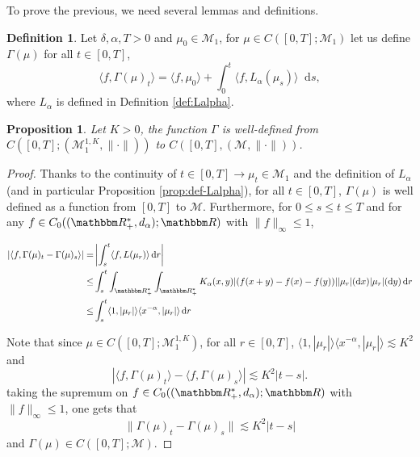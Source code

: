 \documentclass[a4paper,11pt, reqno]{amsart}
\newcommand{\cM}{\mathcal{M}}	\newcommand{\MM}{\mathbbm{M}}
\newcommand{\dd}{\mathop{}\!\mathrm{d}}
\newcommand{\1}{\mathbbm{1}}
\theoremstyle{plain}
\newtheorem{proposition}[theorem]{Proposition}
\theoremstyle{definition}
\newtheorem{definition}[theorem]{Definition}
\begin{document}
To prove the previous, we need several lemmas and definitions.

\begin{definition}
  Let $\delta, \alpha, T > 0$ and $\mu_0 \in \cM_1$, for $\mu \in C
  ([0, T] ; \cM_1)$ let us define $\Gamma (\mu)$ for all $t \in [0,
  T]$,
  \[ \langle f, \Gamma (\mu)_t \rangle = \langle f, \mu_0 \rangle + \int_0^t
     \langle f, L_{\alpha} (\mu_s) \rangle \dd s, \]
  where $L_{\alpha}$ is defined in Definition \ref{def:Lalpha}.
\end{definition}

\begin{proposition}
  \label{prop:gamma-well-defined}Let $K > 0$, the function $\Gamma$ is
  well-defined from $C ([0, T] ; (\cM_1^{1, K}, \| \cdot \|))$ to $C
  ([0, T], (\cM, \| \cdot \|))$.
\end{proposition}

\begin{proof}
  Thanks to the continuity of $t \in [0, T] \rightarrow \mu_t \in
  \cM_1$ and the definition of $L_{\alpha}$ (and in particular
  Proposition \ref{prop:def-Lalpha}), for all $t \in [0, T]$, $\Gamma (\mu)$
  is well defined as a function from $[0, T]$ to $\cM$. Furthermore,
  for $0 \le s \le t \le T$ and for any $f \in C_0
  ((\RR_+^{\ast}, d_{\alpha}) ; \RR)$ with $\| f \|_{\infty}
  \le 1$,
  
  \begin{align*}
    | \langle f, \Gamma (\mu)_t - \Gamma (\mu)_s \rangle | = & \left| \int_s^t
    \langle f, L (\mu_r) \rangle \dd r \right|\\
    \le & \int_s^t \int_{\RR^{\ast}_+} \int_{\RR^{\ast}_+}
    K_{\alpha} (x, y) | (f (x + y) - f (x) - f (y)) | | \mu_r | (\dd x) |
    \mu_r | (\dd y) \dd r\\
    \le & \int_s^t \langle 1, | \mu_r | \rangle \langle x^{- \alpha}, |
    \mu_r | \rangle \dd r
  \end{align*}
  
  Note that since $\mu \in C ([0, T] ; \cM^{1, K}_1)$, for all $r \in
  [0, T]$, $\langle 1, | \mu_r | \rangle \langle x^{- \alpha}, | \mu_r |
  \rangle \lesssim K^2$ and
  \[ | \langle f, \Gamma (\mu)_t \rangle - \langle f, \Gamma (\mu)_s \rangle |
     \lesssim K^2 | t - s | . \]
  taking the supremum on $f \in C_0 ((\RR_+^{\ast}, d_{\alpha}) ;
  \RR)$ with $\| f \|_{\infty} \le 1$, one gets that
  \[ \| \Gamma (\mu)_t - \Gamma (\mu)_s \| \lesssim K^2 | t - s | \]
  and $\Gamma (\mu) \in C ([0, T] ; \cM)$.
\end{proof}
\end{document}
